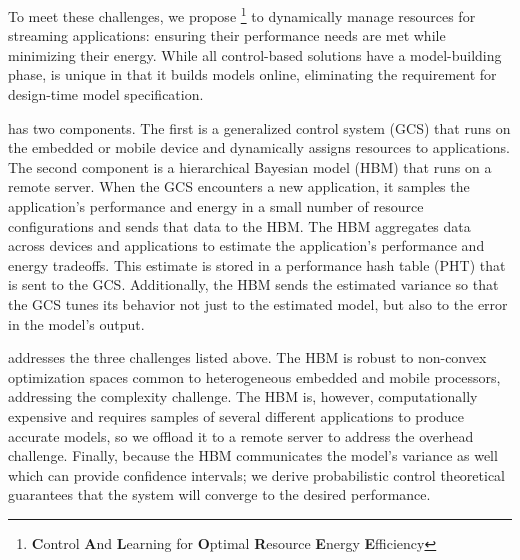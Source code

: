 To meet these challenges, we propose
\SYSTEM{}\footnote{\textbf{C}ontrol \textbf{A}nd \textbf{L}earning for
  \textbf{O}ptimal \textbf{R}esource \textbf{E}nergy
  \textbf{E}fficiency} to dynamically manage resources for streaming
applications: ensuring their performance needs are met while
minimizing their energy.  While all control-based solutions have a
model-building phase, \SYSTEM{} is unique in that it builds models
online, eliminating the requirement for design-time model
specification.

\SYSTEM{} has two components.  The first is a generalized control
system (GCS) that runs on the embedded or mobile device and
dynamically assigns resources to applications.  The second component
is a hierarchical Bayes\-ian model (HBM) that runs on a remote server.
When the GCS encounters a new application, it samples the
application's performance and energy in a small number of resource
configurations and sends that data to the HBM.  The HBM aggregates
data across devices and applications to estimate the application's
performance and energy tradeoffs.  This estimate is stored in a
performance hash table (PHT) that is sent to the GCS.  Additionally,
the HBM sends the estimated variance so that the GCS tunes its
behavior not just to the estimated model, but also to the error in the
model's output.

\SYSTEM{} addresses the three challenges listed above.  The HBM is
robust to non-convex optimization spaces common to heterogeneous
embedded and mobile processors, addressing the complexity challenge.
The HBM is, however, computationally expensive and requires samples of
several different applications to produce accurate models, so we
offload it to a remote server to address the overhead challenge.
Finally, because the HBM communicates the model's variance as well which can provide
confidence intervals; we derive probabilistic control theoretical
guarantees that the system will converge to the desired performance.

